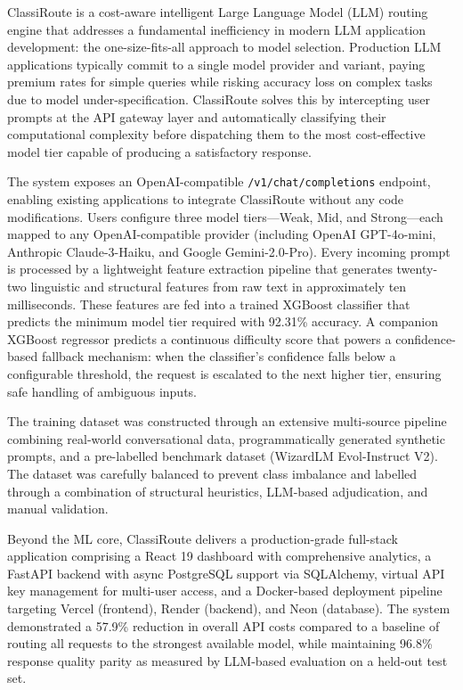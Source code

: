 \documentclass[oneside,12pt,a4paper]{report}
\begin{document}
ClassiRoute is a cost-aware intelligent Large Language Model (LLM) routing engine that addresses a fundamental inefficiency in modern LLM application development: the one-size-fits-all approach to model selection. Production LLM applications typically commit to a single model provider and variant, paying premium rates for simple queries while risking accuracy loss on complex tasks due to model under-specification. ClassiRoute solves this by intercepting user prompts at the API gateway layer and automatically classifying their computational complexity before dispatching them to the most cost-effective model tier capable of producing a satisfactory response.

The system exposes an OpenAI-compatible \texttt{/v1/chat/completions} endpoint, enabling existing applications to integrate ClassiRoute without any code modifications. Users configure three model tiers---Weak, Mid, and Strong---each mapped to any OpenAI-compatible provider (including OpenAI GPT-4o-mini, Anthropic Claude-3-Haiku, and Google Gemini-2.0-Pro). Every incoming prompt is processed by a lightweight feature extraction pipeline that generates twenty-two linguistic and structural features from raw text in approximately ten milliseconds. These features are fed into a trained XGBoost classifier that predicts the minimum model tier required with 92.31\% accuracy. A companion XGBoost regressor predicts a continuous difficulty score that powers a confidence-based fallback mechanism: when the classifier's confidence falls below a configurable threshold, the request is escalated to the next higher tier, ensuring safe handling of ambiguous inputs.

The training dataset was constructed through an extensive multi-source pipeline combining real-world conversational data, programmatically generated synthetic prompts, and a pre-labelled benchmark dataset (WizardLM Evol-Instruct V2). The dataset was carefully balanced to prevent class imbalance and labelled through a combination of structural heuristics, LLM-based adjudication, and manual validation.

Beyond the ML core, ClassiRoute delivers a production-grade full-stack application comprising a React 19 dashboard with comprehensive analytics, a FastAPI backend with async PostgreSQL support via SQLAlchemy, virtual API key management for multi-user access, and a Docker-based deployment pipeline targeting Vercel (frontend), Render (backend), and Neon (database). The system demonstrated a 57.9\% reduction in overall API costs compared to a baseline of routing all requests to the strongest available model, while maintaining 96.8\% response quality parity as measured by LLM-based evaluation on a held-out test set.
\end{document}

